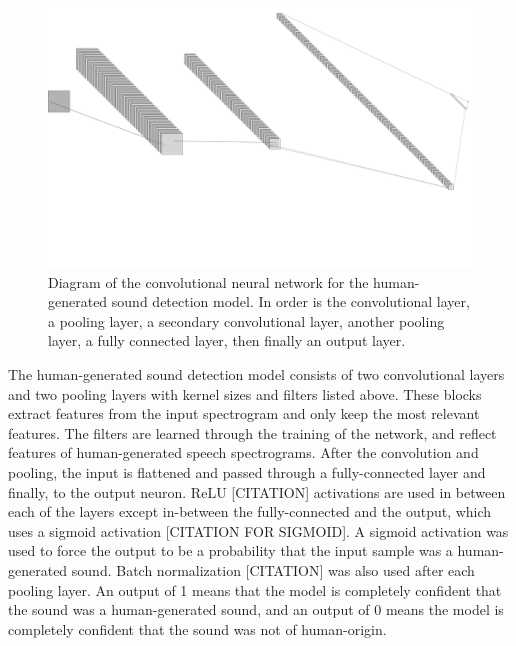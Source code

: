 \documentclass{article}
\begin{document}
\begin{figure}[ht]
\begin{center}
\centerline{\includegraphics[width=\columnwidth]{nn_diagram}}
\caption{Diagram of the convolutional neural network for the human-generated sound detection model. In order is the convolutional layer, a pooling layer, a secondary convolutional layer, another pooling layer, a fully connected layer, then finally an output layer.}
\end{center}
\end{figure}
The human-generated sound detection model consists of two convolutional layers and two pooling layers with kernel sizes and filters listed above. These blocks extract features from the input spectrogram and only keep the most relevant features. The filters are learned through the training of the network, and reflect features of human-generated speech spectrograms. After the convolution and pooling, the input is flattened and passed through a fully-connected layer and finally, to the output neuron. ReLU [CITATION] activations are used in between each of the layers except in-between the fully-connected and the output, which uses a sigmoid activation [CITATION FOR SIGMOID]. A sigmoid activation was used to force the output to be a probability that the input sample was a human-generated sound. Batch normalization [CITATION] was also used after each pooling layer. An output of 1 means that the model is completely confident that the sound was a human-generated sound, and an output of 0 means the model is completely confident that the sound was not of human-origin.
\end{document}
